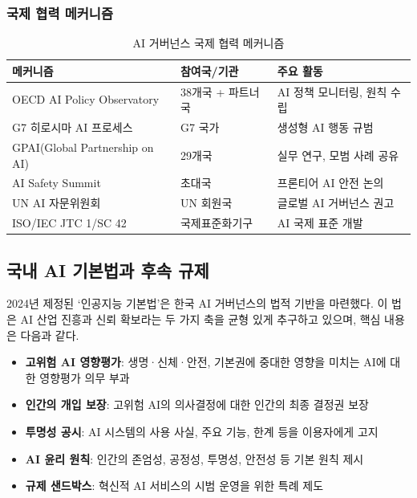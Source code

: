 \subsubsection{국제 협력 메커니즘}

\begin{table}[htbp]
\centering
\caption{AI 거버넌스 국제 협력 메커니즘}
\label{tab:20_intl_cooperation}
\begin{tabularx}{\textwidth}{p{3cm}p{3cm}X}
\toprule
\textbf{메커니즘} & \textbf{참여국/기관} & \textbf{주요 활동} \\
\midrule
OECD AI Policy Observatory & 38개국 + 파트너국 & AI 정책 모니터링, 원칙 수립 \\
G7 히로시마 AI 프로세스 & G7 국가 & 생성형 AI 행동 규범 \\
GPAI(Global Partnership on AI) & 29개국 & 실무 연구, 모범 사례 공유 \\
AI Safety Summit & 초대국 & 프론티어 AI 안전\cite{hendrycks2021unsolved} 논의 \\
UN AI 자문위원회 & UN 회원국 & 글로벌 AI 거버넌스 권고 \\
ISO/IEC JTC 1/SC 42 & 국제표준화기구 & AI 국제 표준 개발 \\
\bottomrule
\end{tabularx}
\end{table}

\subsection{국내 AI 기본법과 후속 규제}
\label{sec:20.2.2}

2024년 제정된 `인공지능 기본법'은 한국 AI 거버넌스의 법적 기반을 마련했다. 이 법은 AI 산업 진흥과 신뢰 확보라는 두 가지 축을 균형 있게 추구하고 있으며, 핵심 내용은 다음과 같다.

\begin{itemize}
 \item \textbf{고위험 AI 영향평가}: 생명·신체·안전, 기본권에 중대한 영향을 미치는 AI에 대한 영향평가 의무 부과
 \item \textbf{인간의 개입 보장}: 고위험 AI의 의사결정에 대한 인간의 최종 결정권 보장
 \item \textbf{투명성 공시}: AI 시스템의 사용 사실, 주요 기능, 한계 등을 이용자에게 고지
 \item \textbf{AI 윤리 원칙}: 인간의 존엄성, 공정성, 투명성, 안전성 등 기본 원칙 제시
 \item \textbf{규제 샌드박스}: 혁신적 AI 서비스의 시범 운영을 위한 특례 제도
\end{itemize}


